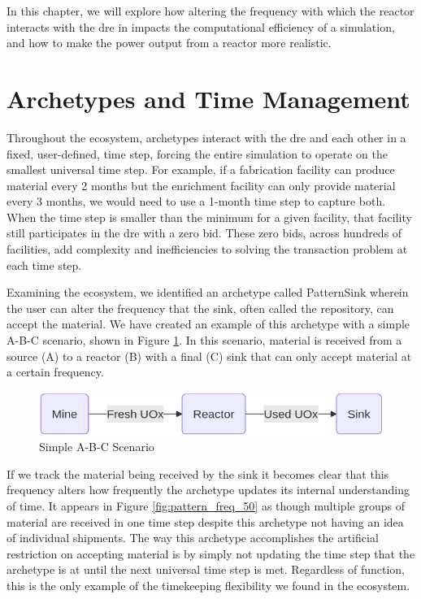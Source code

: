 In this chapter, we will explore how altering the frequency with which the \cycamore reactor interacts with the \gls{dre} in \cyclus impacts the computational efficiency of a simulation, and how to make the power output from a reactor more realistic.

\section{Archetypes and Time Management}
\label{sec:archetypes_and_time_management}

Throughout the \cyclus ecosystem, archetypes interact with the \gls{dre} and
each other in a fixed, user-defined, time step, forcing the entire simulation
to operate on the smallest universal time step. For example, if a fabrication
facility can produce material every 2 months but the enrichment facility can
only provide material every 3 months, we would need to use a 1-month time step
to capture both. When the time step is smaller than the minimum for a given
facility, that facility still participates in the \gls{dre} with a zero bid.
These zero bids, across hundreds of facilities, add complexity and
inefficiencies to solving the transaction problem at each time step.

Examining the \cyclus ecosystem, we identified an archetype called PatternSink
wherein the user can alter the frequency that the sink, often called
the repository, can accept the material. We have created an example of this
archetype with a simple A-B-C scenario, shown in Figure \ref{fig:a-b-c}. In
this scenario, material is received from a source (A) to a reactor (B) with a
final (C) sink that can only accept material at a certain frequency.

\begin{figure}[H]
    \centering
    \includegraphics[scale=0.4]{images/cyclus/a-b-c.png}
    \caption{Simple A-B-C Scenario}
    \label{fig:a-b-c}
\end{figure}

If we track the material being received by the sink it becomes clear that this
frequency alters how frequently the archetype updates its internal
understanding of time. It appears in Figure \ref{fig:pattern_freq_50} as though
multiple groups of material are received in one time step despite this
archetype not having an idea of individual shipments. The way this archetype
accomplishes the artificial restriction on accepting material is by simply not
updating the time step that the archetype is at until the next universal time
step is met. Regardless of function, this is the only example of the
timekeeping flexibility we found in the ecosystem.

